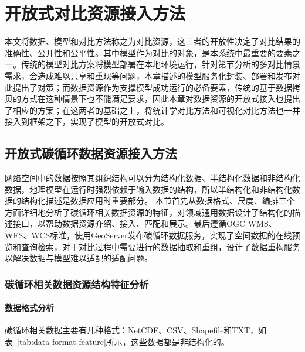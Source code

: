 \chapter{开放式对比资源接入方法}
本文将数据、模型和对比方法称之为对比资源，这三者的开放性决定了对比结果的准确性、公开性和公平性。其中模型作为对比的对象，是本系统中最重要的要素之一。传统的模型对比方案将模型部署在本地环境运行，针对第\label{sec:cmp-sln}节分析的多对比情景需求，会造成难以共享和重现等问题，本章描述的模型服务化封装、部署和发布对此提出了对策；而数据资源作为支撑模型成功运行的必备要素，传统的基于数据拷贝的方式在这种情景下也不能满足要求，因此本章对数据资源的开放式接入也提出了相应的方案；在这两者的基础之上，将统计学对比方法和可视化对比方法也一并接入到框架之下，实现了模型的开放式对比。

\section{开放式碳循环数据资源接入方法}
\label{sec:data-joinup}
网络空间中的数据按照其组织结构可以分为结构化数据、半结构化数据和非结构化数据，地理模型在运行时强烈依赖于输入数据的结构，所以半结构化和非结构化数据的结构化描述是数据应用时重要部分。
本节首先从数据格式、尺度、编排三个方面详细地分析了碳循环相关数据资源的特征，对领域通用数据设计了结构化的描述接口，以帮助数据资源介绍、接入、匹配和展示。最后遵循OGC WMS、WFS、WCS标准，使用GeoServer发布碳循环数据服务，实现了空间数据的在线预览和查询检索，对于对比过程中需要进行的数据抽取和重组，设计了数据重构服务以解决数据与模型难以适配的适配问题。

\subsection{碳循环相关数据资源结构特征分析}
\subsubsection{数据格式分析}
碳循环相关数据主要有几种格式：NetCDF、CSV、Shapefile和TXT，如表~\ref{tab:data-format-feature}所示，这些数据都是非结构化的。

